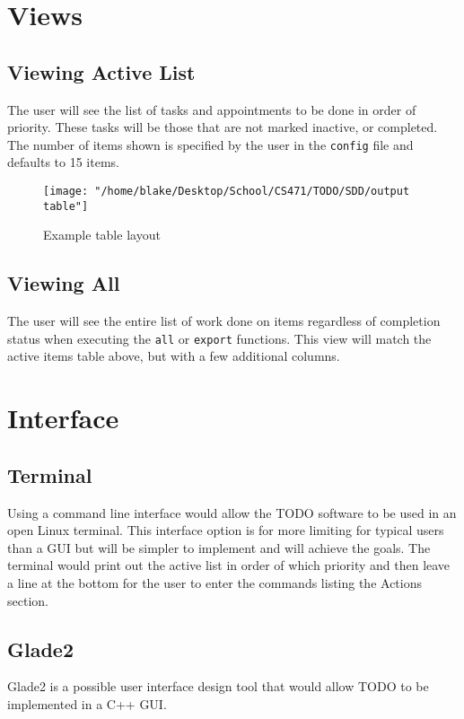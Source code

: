 \documentclass[12pt]{article}
\newcommand{\e}[1] {{\tt #1}}
\begin{document}
\section{Views}
\subsection{Viewing Active List}
The user will see the list of tasks and appointments to be done in order of priority. These tasks will be those that are not marked inactive, or completed. The number of items shown is specified by the user in the \e{config} file and defaults to 15 items. 
\\
\begin{center}
\begin{figure}[H]
\texttt{[image: "/home/blake/Desktop/School/CS471/TODO/SDD/output table"]}
\caption{Example table layout}
\label{fig:table}
\end{figure}
\end{center}

\subsection{Viewing All} \label{sec:View all}
The user will see the entire list of work done on items regardless of completion status when executing the \e{all} or \e{export} functions.
This view will match the active items table above, but with a few additional columns.

\section{Interface}
\subsection{Terminal}
Using a command line interface would allow the TODO software to be used in an open Linux terminal. This interface option is for more limiting for typical users than a GUI but will be simpler to implement and will achieve the goals. The terminal would print out the active list in order of which priority and then leave a line at the bottom for the user to enter the commands listing the Actions section.

\subsection{Glade2}
Glade2 is a possible user interface design tool that would allow TODO to be implemented in a C++ GUI.  
\end{document}

